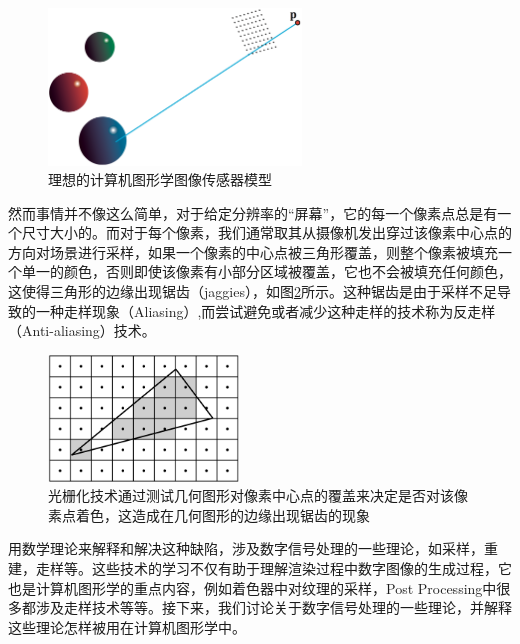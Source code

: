 \begin{figure}
\sidecaption
	\includegraphics[width=0.6\textwidth]{figures/intro/camera}
	\caption{理想的计算机图形学图像传感器模型}
	\label{f:intro-camera}
\end{figure}

然而事情并不像这么简单，对于给定分辨率的“屏幕”，它的每一个像素点总是有一个尺寸大小的。而对于每个像素，我们通常取其从摄像机发出穿过该像素中心点的方向对场景进行采样，如果一个像素的中心点被三角形覆盖，则整个像素被填充一个单一的颜色，否则即使该像素有小部分区域被覆盖，它也不会被填充任何颜色，这使得三角形的边缘出现锯齿（jaggies），如图\ref{f:intro-aliasing-triangle}所示。这种锯齿是由于采样不足导致的一种走样现象（Aliasing）,而尝试避免或者减少这种走样的技术称为反走样（Anti-aliasing）技术。

\begin{figure}
\sidecaption
	\includegraphics[width=0.45\textwidth]{figures/intro/aliasing-triangle}
	\caption{光栅化技术通过测试几何图形对像素中心点的覆盖来决定是否对该像素点着色，这造成在几何图形的边缘出现锯齿的现象}
	\label{f:intro-aliasing-triangle}
\end{figure}

用数学理论来解释和解决这种缺陷，涉及数字信号处理的一些理论，如采样，重建，走样等。这些技术的学习不仅有助于理解渲染过程中数字图像的生成过程，它也是计算机图形学的重点内容，例如着色器中对纹理的采样，Post Processing中很多都涉及走样技术等等。接下来，我们讨论关于数字信号处理的一些理论，并解释这些理论怎样被用在计算机图形学中。







